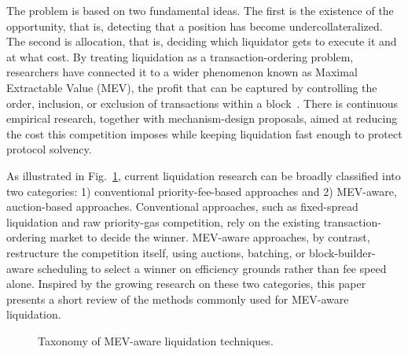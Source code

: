 \documentclass[conference]{IEEEtran}
\begin{document}
The problem is based on two fundamental ideas. The first is the
existence of the opportunity, that is, detecting that a position has
become undercollateralized. The second is allocation, that is, deciding
which liquidator gets to execute it and at what cost. By treating
liquidation as a transaction-ordering problem, researchers have connected
it to a wider phenomenon known as Maximal Extractable Value (MEV), the
profit that can be captured by controlling the order, inclusion, or
exclusion of transactions within a block~\cite{daian2019flash}. There is
continuous empirical research, together with mechanism-design proposals,
aimed at reducing the cost this competition imposes while keeping
liquidation fast enough to protect protocol solvency.

As illustrated in Fig.~\ref{fig:taxonomy}, current liquidation research
can be broadly classified into two categories: 1) conventional
priority-fee-based approaches and 2) MEV-aware, auction-based
approaches. Conventional approaches, such as fixed-spread liquidation and
raw priority-gas competition, rely on the existing transaction-ordering
market to decide the winner. MEV-aware approaches, by contrast,
restructure the competition itself, using auctions, batching, or
block-builder-aware scheduling to select a winner on efficiency grounds
rather than fee speed alone. Inspired by the growing research on these
two categories, this paper presents a short review of the methods
commonly used for MEV-aware liquidation.

\begin{figure}[!t]
\centering
{}
\caption{Taxonomy of MEV-aware liquidation techniques.}
\label{fig:taxonomy}
\end{figure}
\end{document}
